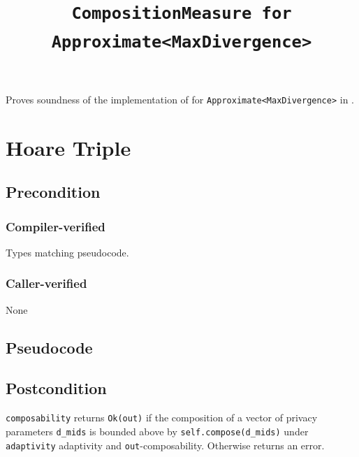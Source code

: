 \documentclass{article}
\title{\texttt{CompositionMeasure for Approximate<MaxDivergence>}}
\author{\MichaelShoemateAuthor}
\date{}
\begin{document}
\maketitle

\contrib
Proves soundness of the implementation of 
for \texttt{Approximate<MaxDivergence>} in .

\section{Hoare Triple}
\subsection*{Precondition}
\subsubsection*{Compiler-verified}
Types matching pseudocode.


\subsubsection*{Caller-verified}
None

\subsection*{Pseudocode}


\subsection*{Postcondition}
\begin{theorem}
  \texttt{composability} returns \texttt{Ok(out)} if the composition of a vector of privacy parameters \texttt{d\_mids}
  is bounded above by \texttt{self.compose(d\_mids)} under \texttt{adaptivity} adaptivity and \texttt{out}-composability.
  Otherwise returns an error.
\end{theorem}
\end{document}
